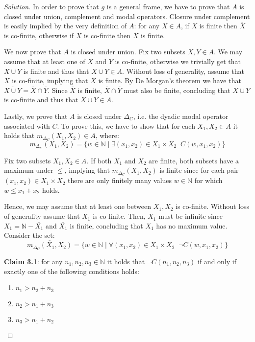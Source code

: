 \documentclass[12pt,a4paper]{report}
\theoremstyle{definition}
\newcommand{\N}{\mathbb{N}}                     %
\begin{document}
    \begin{proof}[Solution]
        In order to prove that $g$ is a general frame, we have to prove that $A$ is closed under union, complement and modal operators. Closure under complement is easily implied by the very definition of $A$: for any $X \in A$, if $X$ is finite then $\overline{X}$ is co-finite, otherwise if $X$ is co-finite then $\overline{X}$ is finite.
        
        We now prove that $A$ is closed under union. Fix two subsets $X,Y \in A$. We may assume that at least one of $X$ and $Y$ is co-finite, otherwise we trivially get that $X \cup Y$ is finite and thus that $X \cup Y \in A$. Without loss of generality, assume that $X$ is co-finite, implying that $\overline{X}$ is finite. By De Morgan's theorem we have that $\overline{X \cup Y} = \overline{X} \cap \overline{Y}$. Since $\overline{X}$ is finite, $\overline{X} \cap \overline{Y}$ must also be finite, concluding that $X \cup Y$ is co-finite and thus that $X \cup Y \in A$.

        Lastly, we prove that $A$ is closed under $\Delta_{C}$, i.e. the dyadic modal operator associated with $C$. To prove this, we have to show that for each $X_1,X_2 \in A$ it holds that $m_{\Delta_{C}}(X_1, X_2) \in A$, where:
        \[m_{\Delta_{C}}(X_1, X_2) = \{w \in \N \mid \exists (x_1,x_2) \in X_1 \times X_2 \;\; C(w,x_1,x_2)\}\]

        Fix two subsets $X_1,X_2 \in A$. If both $X_1$ and $X_2$ are finite, both subsets have a maximum under $\leq$, implying that $m_{\Delta_{C}}(X_1, X_2)$ is finite since for each pair $(x_1,x_2) \in X_1 \times X_2$ there are only finitely many values $w \in \N$ for which $w \leq x_1+x_2$ holds.

        Hence, we may assume that at least one between $X_1, X_2$ is co-finite. Without loss of generality assume that $X_1$ is co-finite. Then, $X_1$ must be infinite since $X_1 = \N - \overline{X_1}$ and $\overline{X_1}$ is finite, concluding that $X_1$ has no maximum value. Consider the set:
        \[\overline{m_{\Delta_{C}}(X_1, X_2)} = \{w \in \N \mid \forall (x_1,x_2) \in X_1 \times X_2 \;\; \lnot C(w,x_1,x_2)\}\]

        \textbf{Claim 3.1}: for any $n_1, n_2, n_3 \in \N$ it holds that $\lnot C(n_1, n_2, n_3)$ if and only if exactly one of the following conditions holds:
        \begin{enumerate}
            \item $n_1 > n_2 + n_3$
            \item $n_2 > n_1 + n_3$
            \item $n_3 > n_1 + n_2$
        \end{enumerate}


\end{proof}
\end{document}
